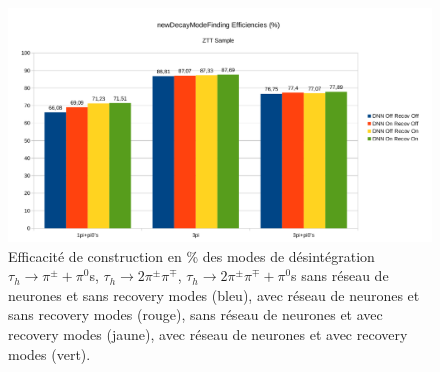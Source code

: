 \begin{figure}[!ht]
    \centering
    \includegraphics[scale=0.35]{Chapitre4/Images/recov.png} 
  \caption{Efficacité de construction en \% des modes de désintégration $\tau_h\to\pi^{\pm}+\pi^0$s, $\tau_h\to2\pi^{\pm}\pi^{\mp}$, $\tau_h\to2\pi^{\pm}\pi^{\mp}+\pi^0$s sans réseau de neurones et sans recovery modes (bleu), avec réseau de neurones et sans recovery modes (rouge), sans réseau de neurones et avec recovery modes (jaune), avec réseau de neurones et avec recovery modes (vert).}
  \label{recoverymodes}
\end{figure}